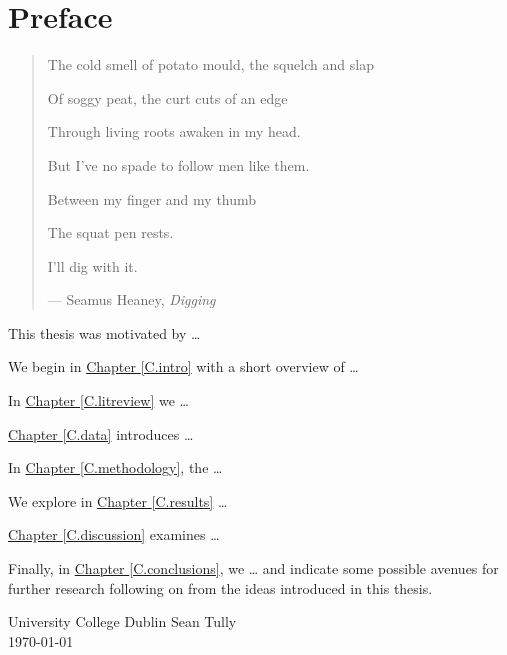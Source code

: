 %
%
%
%

\chapter*{Preface}

\begin{quote}
The cold smell of potato mould, the squelch and slap

Of soggy peat, the curt cuts of an edge

Through living roots awaken in my head.

But I've no spade to follow men like them.

Between my finger and my thumb

The squat pen rests.

I'll dig with it.

\hspace{2cm}--- Seamus Heaney, \emph{Digging}
\end{quote}

This thesis was motivated by \ldots

We begin in \hyperref[C.intro]{Chapter \ref*{C.intro}} with a short overview of
\ldots 

In \hyperref[C.litreview]{Chapter \ref*{C.litreview}} we \ldots 

\hyperref[C.data]{Chapter \ref*{C.data}} introduces \ldots 

In \hyperref[C.methodology]{Chapter \ref*{C.methodology}}, the \ldots 

We explore in \hyperref[C.results]{Chapter \ref*{C.results}} \ldots 

\hyperref[C.discussion]{Chapter \ref*{C.discussion}} examines \ldots 

Finally, in \hyperref[C.conclusions]{Chapter \ref*{C.conclusions}}, we \ldots{} 
and indicate some possible avenues for further research following on from the
ideas introduced in this thesis.

\vspace{2em}

University College Dublin \hfill Sean Tully \\
\today 
